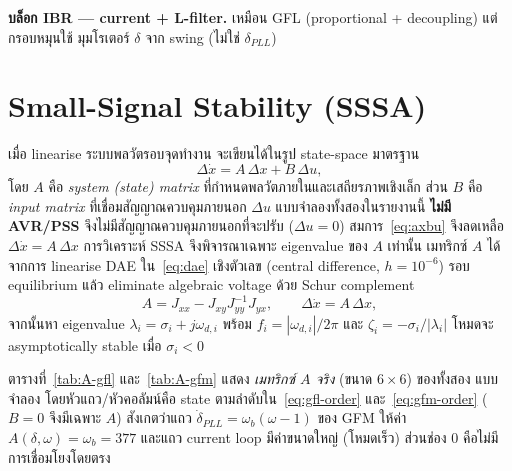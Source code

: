 \documentclass[12pt,a4paper]{article}
\begin{document}
\noindent\textbf{บล็อก IBR --- current + L-filter.} เหมือน GFL (proportional + decoupling) แต่กรอบหมุนใช้
มุมโรเตอร์ $\delta$ จาก swing (ไม่ใช่ $\delta_{PLL}$)

\section{Small-Signal Stability (SSSA)}

เมื่อ linearise ระบบพลวัตรอบจุดทำงาน จะเขียนได้ในรูป state-space มาตรฐาน
\begin{equation}
\Delta\dot x = A\,\Delta x + B\,\Delta u,
\label{eq:axbu}
\end{equation}
โดย $A$ คือ \emph{system (state) matrix} ที่กำหนดพลวัตภายในและเสถียรภาพเชิงเล็ก ส่วน $B$ คือ
\emph{input matrix} ที่เชื่อมสัญญาณควบคุมภายนอก $\Delta u$ แบบจำลองทั้งสองในรายงานนี้ \textbf{ไม่มี
AVR/PSS} จึงไม่มีสัญญาณควบคุมภายนอกที่จะปรับ ($\Delta u=0$) สมการ~\eqref{eq:axbu} จึงลดเหลือ
$\Delta\dot x=A\,\Delta x$ การวิเคราะห์ SSSA จึงพิจารณาเฉพาะ eigenvalue ของ $A$ เท่านั้น เมทริกซ์ $A$
ได้จากการ linearise DAE ใน~\eqref{eq:dae} เชิงตัวเลข (central difference, $h=10^{-6}$) รอบ equilibrium
แล้ว eliminate algebraic voltage ด้วย Schur complement
\begin{equation}
A = J_{xx}-J_{xy}J_{yy}^{-1}J_{yx},\qquad \Delta\dot x = A\,\Delta x,
\end{equation}
จากนั้นหา eigenvalue $\lambda_i=\sigma_i+j\omega_{d,i}$ พร้อม $f_i=|\omega_{d,i}|/2\pi$ และ
$\zeta_i=-\sigma_i/|\lambda_i|$ โหมดจะ asymptotically stable เมื่อ $\sigma_i<0$

ตารางที่~\ref{tab:A-gfl} และ~\ref{tab:A-gfm} แสดง \emph{เมทริกซ์ $A$ จริง} (ขนาด $6\times6$) ของทั้งสอง
แบบจำลอง โดยหัวแถว/หัวคอลัมน์คือ state ตามลำดับใน~\eqref{eq:gfl-order} และ~\eqref{eq:gfm-order} ($B=0$
จึงมีเฉพาะ $A$) สังเกตว่าแถว $\dot\delta_{PLL}=\omega_b(\omega-1)$ ของ GFM ให้ค่า $A(\delta,\omega)=\omega_b=377$
และแถว current loop มีค่าขนาดใหญ่ (โหมดเร็ว) ส่วนช่อง $0$ คือไม่มีการเชื่อมโยงโดยตรง

\begin{table}[H]\centering\small
\caption{เมทริกซ์ $A$ ของ GFL 6-state ($\Delta\dot x = A\,\Delta x$, หน่วย 1/s)}
\label{tab:A-gfl}
\resizebox{\textwidth}{!}{}
\end{table}

\begin{table}[H]\centering\small
\caption{เมทริกซ์ $A$ ของ GFM 6-state ($\Delta\dot x = A\,\Delta x$, หน่วย 1/s)}
\label{tab:A-gfm}
\resizebox{\textwidth}{!}{}
\end{table}
\end{document}
